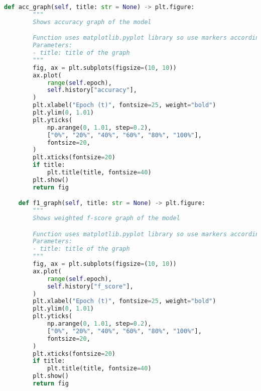 \begin{lstlisting}[language=Python]
    def acc_graph(self, title: str = None) -> plt.figure:
        """
        Shows accuracy graph of the model

        Function uses matplotlib.pyplot library so use markers according to matplotlib.pyplot library
        Parameters:
        - title: title of the graph
        """
        fig, ax = plt.subplots(figsize=(10, 10))
        ax.plot(
            range(self.epoch),
            self.history["accuracy"],
        )
        plt.xlabel("Epoch (t)", fontsize=25, weight="bold")
        plt.ylim(0, 1.01)
        plt.yticks(
            np.arange(0, 1.01, step=0.2),
            ["0%", "20%", "40%", "60%", "80%", "100%"],
            fontsize=20,
        )
        plt.xticks(fontsize=20)
        if title:
            plt.title(title, fontsize=40)
        plt.show()
        return fig

    def f1_graph(self, title: str = None) -> plt.figure:
        """
        Shows weighted f-score graph of the model

        Function uses matplotlib.pyplot library so use markers according to matplotlib.pyplot library
        Parameters:
        - title: title of the graph
        """
        fig, ax = plt.subplots(figsize=(10, 10))
        ax.plot(
            range(self.epoch),
            self.history["f_score"],
        )
        plt.xlabel("Epoch (t)", fontsize=25, weight="bold")
        plt.ylim(0, 1.01)
        plt.yticks(
            np.arange(0, 1.01, step=0.2),
            ["0%", "20%", "40%", "60%", "80%", "100%"],
            fontsize=20,
        )
        plt.xticks(fontsize=20)
        if title:
            plt.title(title, fontsize=40)
        plt.show()
        return fig

\end{lstlisting}


